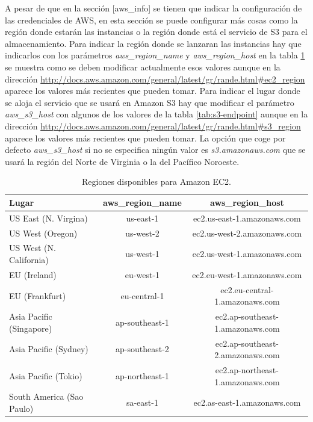 \documentclass{article}
\begin{document}
	A pesar de que en la sección [aws\_info] se tienen que indicar la configuración de las credenciales de AWS, en esta sección se puede configurar más cosas como la región donde estarán las instancias o la región donde está el servicio de S3 para el almacenamiento. Para indicar la región donde se lanzaran las instancias hay que indicarlos con los parámetros \emph{aws\_region\_name} y \emph{aws\_region\_host} en la tabla \ref{tab:ec2-endpoint} se muestra como se deben modificar actualmente esos valores aunque en la dirección \url{http://docs.aws.amazon.com/general/latest/gr/rande.html#ec2_region} aparece los valores más recientes que pueden tomar. Para indicar el lugar donde se aloja el servicio que se usará en Amazon S3 hay que modificar el parámetro \emph{aws\_s3\_host} con algunos de los valores de la tabla \ref{tab:s3-endpoint} aunque en la dirección \url{http://docs.aws.amazon.com/general/latest/gr/rande.html#s3_region} aparece los valores más recientes que pueden tomar. La opción que coge por defecto \emph{aws\_s3\_host} si no se especifica ningún valor es \emph{s3.amazonaws.com} que se usará la región del Norte de Virginia o la del Pacífico Noroeste.

\begin{table}[h]
	\begin{center}
		\caption{Regiones disponibles para Amazon EC2.}
		\begin{tabular}{|l|c|c|}
\hline
\textbf{Lugar} &
\textbf{aws\_region\_name} &
\textbf{aws\_region\_host} \\ \hline
\hline
US East (N. Virgina)          & us-east-1          &  ec2.us-east-1.amazonaws.com \\ \hline
US West (Oregon)             & us-west-2         &  ec2.us-west-2.amazonaws.com \\ \hline
US West (N. California)      & us-west-1         &  ec2.us-west-1.amazonaws.com \\ \hline
EU (Ireland)                       & eu-west-1         &  ec2.eu-west-1.amazonaws.com \\ \hline
EU (Frankfurt)                   & eu-central-1      & ec2.eu-central-1.amazonaws.com \\ \hline
Asia Pacific (Singapore)     & ap-southeast-1 & ec2.ap-southeast-1.amazonaws.com \\ \hline
Asia Pacific (Sydney)         & ap-southeast-2 & ec2.ap-southeast-2.amazonaws.com \\ \hline
Asia Pacific (Tokio)            & ap-northeast-1 & ec2.ap-northeast-1.amazonaws.com \\ \hline
South America (Sao Paulo) & sa-east-1         & ec2.as-east-1.amazonaws.com \\ \hline
		\end{tabular}
		\label{tab:ec2-endpoint}
	\end{center}
\end{table}
\end{document}
